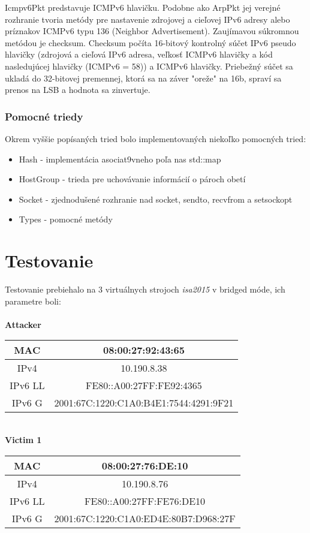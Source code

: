 \documentclass[a4paper,11pt]{article}
\begin{document}
Icmpv6Pkt predstavuje ICMPv6 hlavičku. Podobne ako ArpPkt jej verejné rozhranie tvoria metódy pre nastavenie zdrojovej a cieľovej IPv6 adresy alebo príznakov ICMPv6 typu 136 (Neighbor Advertisement). Zaujímavou súkromnou metódou je checksum. Checksum počíta 16-bitový kontrolný súčet IPv6 pseudo hlavičky (zdrojová a cieľová IPv6 adresa, veľkosť ICMPv6 hlavičky a kód nasledujúcej hlavičky (ICMPv6 = 58)) a ICMPv6 hlavičky. Priebežný súčet sa ukladá do 32-bitovej premennej, ktorá sa na záver "oreže" na 16b, spraví sa prenos na LSB a hodnota sa zinvertuje.

\subsubsection{Pomocné triedy} \label{helpers}
Okrem vyššie popísaných tried bolo implementovaných niekoľko pomocných tried:
\begin{itemize}
\item Hash - implementácia asociat9vneho poľa nas std::map
\item HostGroup - trieda pre uchovávanie informácií o pároch obetí
\item Socket - zjednodušené rozhranie nad socket, sendto, recvfrom a setsockopt
\item Types - pomocné metódy
\end{itemize}

\newpage
\section{Testovanie}
Testovanie prebiehalo na 3 virtuálnych strojoch \textit{isa2015} v bridged móde, ich parametre boli:
\\ \\
\textbf{Attacker}
\begin{center}
\begin{tabular}{ |c|c| } 
 \hline
 MAC & 08:00:27:92:43:65 \\
 \hline 
 IPv4 & 10.190.8.38 \\ 
 \hline 
 IPv6 LL & FE80::A00:27FF:FE92:4365 \\ 
 \hline 
 IPv6 G & 2001:67C:1220:C1A0:B4E1:7544:4291:9F21 \\
 \hline
\end{tabular}
\end{center}

\ \\
\textbf{Victim 1}
\begin{center}
\begin{tabular}{ |c|c| } 
 \hline
 MAC & 08:00:27:76:DE:10 \\
 \hline 
 IPv4 & 10.190.8.76 \\ 
 \hline 
 IPv6 LL & FE80::A00:27FF:FE76:DE10 \\ 
 \hline 
 IPv6 G & 2001:67C:1220:C1A0:ED4E:80B7:D968:27F \\
 \hline
\end{tabular}
\end{center}
\end{document}
